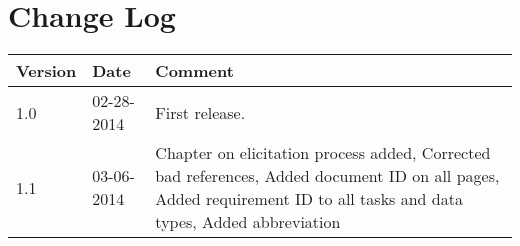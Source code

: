 \documentclass[Main]{subfiles}
\begin{document}
\section*{Change Log}

\begin{table}[H]

\begin{tabular}{p{} p{} p{}}
\hline
\textbf{Version} & \textbf{Date} & \textbf{Comment} \\\hline
1.0 & 02-28-2014 & First release. \\
1.1 & 03-06-2014 & Chapter on elicitation process added, Corrected bad references, Added document ID on all pages, Added requirement ID to all tasks and data types, Added abbreviation\\
\hline
\end{tabular}

\end{table}
\end{document}

